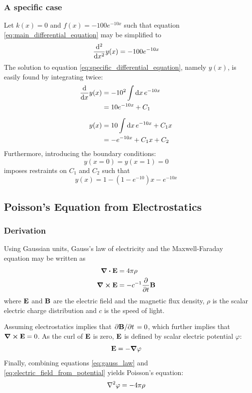 \documentclass[reprint,english]{revtex4-1}
\begin{document}
\subsubsection{A specific case}\label{sec:specific_case}
Let \(k(x)=0\) and \(f(x)=-100e^{-10x}\) such that equation \ref{eq:main_differential_equation} may be simplified to
\begin{equation}\label{eq:specific_differential_equation}
\dv[2]{x}y(x)=-100e^{-10x}
\end{equation}
The solution to equation \eqref{eq:specific_differential_equation}, namely \(y(x)\), is easily found by integrating twice:
\begin{align}
\dv{x}y(x)&=-10^2\int\dd{x}e^{-10x}\nonumber\\
&=10e^{-10x}+C_1\nonumber\\[2mm]
y(x)&=10\int\dd{x}e^{-10x}+C_1x\nonumber\\
&=-e^{-10x}+C_1x+C_2\label{eq:general_solution_to_specific}
\end{align}
Furthermore, introducing the boundary conditions:
\[y(x=0)=y(x=1)=0\]
imposes restraints on \(C_1\) and \(C_2\) such that
\begin{equation}\label{eq:specific_solution_to_specific}
y(x)=1-(1-e^{-10})x-e^{-10x}
\end{equation}
\subsection{Poisson's Equation from Electrostatics}\label{sec:poisson_equation}
\subsubsection{Derivation}
Using Gaussian units, Gauss's law of electricity and the Maxwell-Faraday equation may be written as
\begin{align}
\div\vb{E}&=4\pi\rho\label{eq:gauss_law}\\
\curl\vb{E}&=-c^{-1}\pdv{t}\vb{B}\label{eq:maxwell-farady_equation}
\end{align}
where \(\vb{E}\) and \(\vb{B}\) are the electric field and the magnetic flux density, \(\rho\) is the scalar electric charge distribution and \(c\) is the speed of light.

Assuming electrostatics implies that \(\pdv*{\vb{B}}{t}=0\), which further implies that \(\curl\vb{E}=0\). As the curl of \(\vb{E}\) is zero, \(\vb{E}\) is defined by scalar electric potential \(\varphi\):
\begin{equation}\label{eq:electric_field_from_potential}
\vb{E}=-\grad\varphi
\end{equation}
Finally, combining equations \eqref{eq:gauss_law} and \eqref{eq:electric_field_from_potential} yields Poisson's equation:
\begin{equation}\label{eq:poisson_equation_electrostatics}
\laplacian\varphi=-4\pi\rho
\end{equation}
\end{document}
